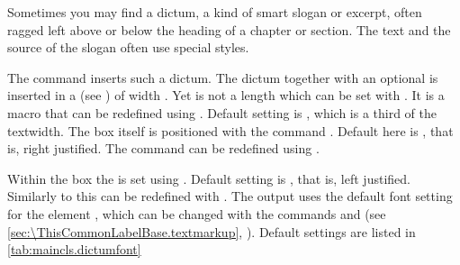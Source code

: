 Sometimes you may find a dictum, a kind of smart slogan or excerpt, often
ragged left above or below the heading of a chapter or section. The text and
the source of the slogan often use special styles.


\begin{Declaration}
\end{Declaration}%
The command  inserts such a dictum. %
%
The dictum together with an optional  is inserted in a
 (see \cite{latex:usrguide}) of width
. Yet  is not a length which can be set
with . It is a macro that can be redefined using
. Default setting is ,
which is a third of the textwidth. The box itself is positioned with the
command . Default here is
, that is, right justified.  The
command  can be redefined using .

Within the box the  is set using .
Default setting is , that is, left
justified. Similarly to  this can be redefined with
.  The output uses the default font setting for the
element , which can be changed with the commands
 and
 (see
\autoref{sec:\ThisCommonLabelBase.textmarkup},
). Default settings are
listed in \autoref{tab:maincls.dictumfont}%

